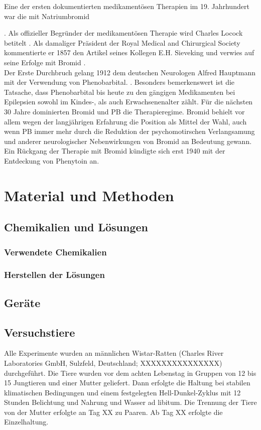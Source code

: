 \documentclass[a4paper,11pt]{report}
\begin{document}
Eine der ersten dokumentierten medikamentösen Therapien im 19. Jahrhundert war die mit Natriumbromid {\cite{OConnor.1857}\cite{ToddRobertBentley18091860.}. Als offizieller Begründer der medikamentösen Therapie wird Charles Locock betitelt \cite{Brodie.2010}. Als damaliger Präsident der Royal Medical and Chirurgical Society kommentierte er 1857 den Artikel seines Kollegen E.H. Sieveking \cite{Sieveking.1857} und verwies auf seine Erfolge mit Bromid \cite{Eadie.2012}.\\
Der Erste Durchbruch gelang 1912 dem deutschen Neurologen Alfred Hauptmann mit der Verwendung von Phenobarbital. \cite{Hauptmann.1912}. Besonders bemerkenswert ist die Tatsache, dass Phenobarbital bis heute zu den gängigen Medikamenten bei Epilepsien sowohl im Kindes-, als auch Erwachsenenalter zählt.\cite{DGN.2017} Für die nächsten 30 Jahre dominierten Bromid und PB die Therapieregime. Bromid behielt vor allem wegen der langjährigen Erfahrung die Position als Mittel der Wahl, auch wenn PB immer mehr durch die Reduktion der psychomotirschen Verlangsamung und anderer neurologischer Nebenwirkungen von Bromid an Bedeutung gewann. \cite{Yasiry.2012}\\
Ein Rückgang der Therapie mit Bromid kündigte sich erst 1940 mit der Entdeckung von Phenytoin \cite{Merritt.1938}an.
\chapter{Material und Methoden}

\section{Chemikalien und Lösungen}

\subsection{Verwendete Chemikalien}

\subsection{Herstellen der Lösungen}

\section{Geräte}

\section{Versuchstiere}
Alle Experimente wurden an männlichen Wistar-Ratten (Charles River Laboratories GmbH, Sulzfeld, Deutschland; XXXXXXXXXXXXXXX) durchgeführt. Die Tiere wurden vor dem  achten Lebenstag in Gruppen von 12 bis 15 Jungtieren und einer Mutter geliefert. Dann erfolgte die Haltung bei stabilen klimatischen Bedingungen und einem festgelegten Hell-Dunkel-Zyklus mit 12 Stunden Belichtung und Nahrung und Wasser ad libitum. Die Trennung der Tiere von der Mutter erfolgte an Tag XX zu Paaren. Ab Tag XX erfolgte die Einzelhaltung.
}
\end{document}
